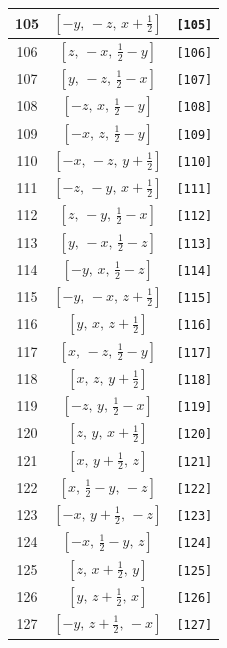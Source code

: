 \documentclass[fleqn,8pt]{jsarticle}
\begin{document}
\begin{longtable}{ccc}
105 & $\left[ - y,\, - z,\, x + \frac{1}{2} \right]$ & {\tt [105]} \\ \hline
106 & $\left[ z,\, - x,\, \frac{1}{2} - y \right]$ & {\tt [106]} \\ \hline
107 & $\left[ y,\, - z,\, \frac{1}{2} - x \right]$ & {\tt [107]} \\ \hline
108 & $\left[ - z,\, x,\, \frac{1}{2} - y \right]$ & {\tt [108]} \\ \hline
109 & $\left[ - x,\, z,\, \frac{1}{2} - y \right]$ & {\tt [109]} \\ \hline
110 & $\left[ - x,\, - z,\, y + \frac{1}{2} \right]$ & {\tt [110]} \\ \hline
111 & $\left[ - z,\, - y,\, x + \frac{1}{2} \right]$ & {\tt [111]} \\ \hline
112 & $\left[ z,\, - y,\, \frac{1}{2} - x \right]$ & {\tt [112]} \\ \hline
113 & $\left[ y,\, - x,\, \frac{1}{2} - z \right]$ & {\tt [113]} \\ \hline
114 & $\left[ - y,\, x,\, \frac{1}{2} - z \right]$ & {\tt [114]} \\ \hline
115 & $\left[ - y,\, - x,\, z + \frac{1}{2} \right]$ & {\tt [115]} \\ \hline
116 & $\left[ y,\, x,\, z + \frac{1}{2} \right]$ & {\tt [116]} \\ \hline
117 & $\left[ x,\, - z,\, \frac{1}{2} - y \right]$ & {\tt [117]} \\ \hline
118 & $\left[ x,\, z,\, y + \frac{1}{2} \right]$ & {\tt [118]} \\ \hline
119 & $\left[ - z,\, y,\, \frac{1}{2} - x \right]$ & {\tt [119]} \\ \hline
120 & $\left[ z,\, y,\, x + \frac{1}{2} \right]$ & {\tt [120]} \\ \hline
121 & $\left[ x,\, y + \frac{1}{2},\, z \right]$ & {\tt [121]} \\ \hline
122 & $\left[ x,\, \frac{1}{2} - y,\, - z \right]$ & {\tt [122]} \\ \hline
123 & $\left[ - x,\, y + \frac{1}{2},\, - z \right]$ & {\tt [123]} \\ \hline
124 & $\left[ - x,\, \frac{1}{2} - y,\, z \right]$ & {\tt [124]} \\ \hline
125 & $\left[ z,\, x + \frac{1}{2},\, y \right]$ & {\tt [125]} \\ \hline
126 & $\left[ y,\, z + \frac{1}{2},\, x \right]$ & {\tt [126]} \\ \hline
127 & $\left[ - y,\, z + \frac{1}{2},\, - x \right]$ & {\tt [127]} \\ \hline

\end{longtable}
\end{document}
